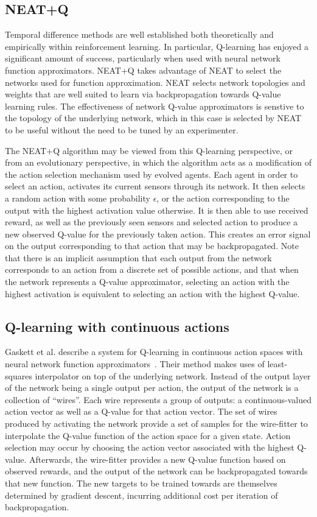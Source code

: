 \documentclass[letterpaper]{article}
\begin{document}
\subsection{NEAT+Q}
Temporal difference methods are well established both theoretically and empirically within reinforcement learning. In particular, Q-learning has enjoyed a significant amount of success, particularly when used with neural network function approximators. NEAT+Q takes advantage of NEAT to select the networks used for function approximation. NEAT selects network topologies and weights that are well suited to learn via backpropagation towards Q-value learning rules. The effectiveness of network Q-value approximators is senstive to the topology of the underlying network, which in this case is selected by NEAT to be useful without the need to be tuned by an experimenter. 

The NEAT+Q algorithm may be viewed from this Q-learning perspective, or from an evolutionary perspective, in which the algorithm acts as a modification of the action selection mechanism used by evolved agents. Each agent in order to select an action, activates its current sensors through its network. It then selects a random action with some probability $\epsilon$, or the action corresponding to the output with the highest activation value otherwise. It is then able to use received reward, as well as the previously seen sensors and selected action to produce a new observed Q-value for the previously taken action. This creates an error signal on the output corresponding to that action that may be backpropagated. Note that there is an implicit assumption that each output from the network corresponds to an action from a discrete set of possible actions, and that when the network represents a Q-value approximator, selecting an action with the highest activation is equivalent to selecting an action with the highest Q-value.

\subsection{Q-learning with continuous actions}
Gaskett et al. describe a system for Q-learning in continuous action spaces with neural network function approximators~\cite{gaskett1999q}. Their method makes uses of least-squares interpolator on top of the underlying network. Instead of the output layer of the network being a single output per action, the output of the network is a collection of ``wires''. Each wire represents a group of outputs: a continuous-valued action vector as well as a Q-value for that action vector. The set of wires produced by activating the network provide a set of samples for the wire-fitter to interpolate the Q-value function of the action space for a given state. Action selection may occur by choosing the action vector associated with the highest Q-value. Afterwards, the wire-fitter provides a new Q-value function based on observed rewards, and the output of the network can be backpropagated towards that new function. The new targets to be trained towards are themselves determined by gradient descent, incurring additional cost per iteration of backpropagation.
\end{document}
